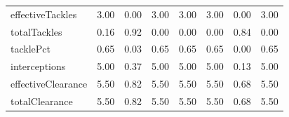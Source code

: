 \begin{table}[H]
\begin{tabular}{lrrrrrrr}
effectiveTackles & 3.00 & 0.00 & 3.00 & 3.00 & 3.00 & 0.00 & 3.00 \\
totalTackles & 0.16 & 0.92 & 0.00 & 0.00 & 0.00 & 0.84 & 0.00 \\
tacklePct & 0.65 & 0.03 & 0.65 & 0.65 & 0.65 & 0.00 & 0.65 \\
interceptions & 5.00 & 0.37 & 5.00 & 5.00 & 5.00 & 0.13 & 5.00 \\
effectiveClearance & 5.50 & 0.82 & 5.50 & 5.50 & 5.50 & 0.68 & 5.50 \\
totalClearance & 5.50 & 0.82 & 5.50 & 5.50 & 5.50 & 0.68 & 5.50 \\
\hline
\end{tabular}
\end{table}
